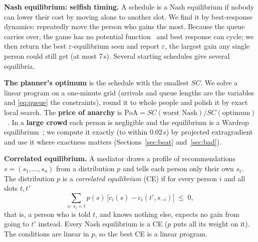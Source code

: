 \documentclass{article}
\begin{document}
\textbf{Nash equilibrium: selfish timing.} A schedule is a Nash equilibrium if nobody can lower their cost by moving
alone to another slot. We find it by best-response dynamics: repeatedly move the person who gains the most. Because the
queue carries over, the game has no potential function~\cite{rosenthal} and best response can cycle; we then return
the best $\varepsilon$-equilibrium seen and report $\varepsilon$, the largest gain any single person could still get
(at most 7\,s). Several starting schedules give several equilibria.

\textbf{The planner's optimum} is the schedule with the smallest $SC$. We solve a linear program on a one-minute grid
(arrivals and queue lengths are the variables and \eqref{eq:queue} the constraints), round it to whole people and
polish it by exact local search. The \textbf{price of anarchy} is $\mathrm{PoA}=SC(\text{worst Nash})/SC(\text{optimum})$~\cite{koutsoupias,roughgarden}.
In a \textbf{large crowd} each person is negligible and the equilibrium is a Wardrop equilibrium~\cite{wardrop}; we
compute it exactly (to within 0.02\,s) by projected extragradient~\cite{korpelevich} and use it where exactness matters
(Sections~\ref{sec:beat} and~\ref{sec:bad}).

\textbf{Correlated equilibrium.} A mediator draws a profile of recommendations $s=(s_1,\dots,s_n)$ from a
distribution $p$ and tells each person only their own $s_i$. The distribution $p$ is a \emph{correlated equilibrium}
(CE) if for every person $i$ and all slots $t,t'$
\begin{equation}\label{eq:ce}
\sum_{s:\;s_i=t} p(s)\,\bigl[c_i(s)-c_i(t',s_{-i})\bigr] \;\le\; 0 ,
\end{equation}
that is, a person who is told $t$, and knows nothing else, expects no gain from going to $t'$ instead. Every Nash
equilibrium is a CE ($p$ puts all its weight on it). The conditions are linear in $p$, so the best CE is a linear
program.
\end{document}
